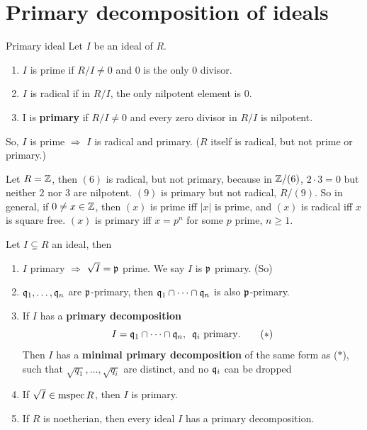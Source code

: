 \documentclass{article}
\begin{document}
\section{Primary decomposition of ideals}
\begin{fancydefine}{Primary ideal}
    Let $I$ be an ideal of $R$. \begin{enumerate}
        \item $I$ is prime if $R/I \neq 0$ and $0$ is the only $0$ divisor.
        \item $I$ is radical if in $R/I$, the only nilpotent element is $0$.
        \item I is \textbf{primary} if $R/I \neq 0$ and every zero divisor in $R/I$ is nilpotent.
    \end{enumerate}
    So, $I$ is prime $\Rightarrow$ $I$ is radical and primary.\gap
    ($R$ itself is radical, but not prime or primary.)
\end{fancydefine}
\begin{ex*}
    Let $R = \mathbb{Z}$, then $(6)$ is radical, but not primary, because in $\mathbb{Z}/(6)$, $2 \cdot 3 = 0$ but neither $2$ nor $3$ are nilpotent.\gap 
    $(9)$ is primary but not radical, $R/(9)$.
    So in general, if $0 \neq x \in \mathbb{Z}$, then $(x)$ is prime iff $|x|$ is prime, and $(x)$ is radical iff $x$ is square free. $(x)$ is primary iff $x=p^{n}$ for some $p$ prime, $n \geq 1$. 
\end{ex*}
\begin{fancyprop}{}
    Let $I \subsetneq R$ an ideal, then \begin{enumerate}
        \item $I$ primary $\Rightarrow$ $\sqrt{I} = \mathfrak{p}$ prime. We say $I$ is $\mathfrak{p}$ primary. (So)
        \item $\mathfrak{q}_{1}, \dots, \mathfrak{q}_{n}$ are $\mathfrak{p}$-primary, then $\mathfrak{q}_{1} \cap \dots \cap \mathfrak{q}_{n}$ is also $\mathfrak{p}$-primary.
        \item If $I$ has a \textbf{primary decomposition} \[I = \mathfrak{q}_{1} \cap \dots \cap \mathfrak{q}_{n}, \,\,\, \mathfrak{q}_{i} \text{ primary}. \tag{$*$}\]
        Then $I$ has a \textbf{minimal primary decomposition} of the same form as ($*$), such that $\sqrt{q_{1}}, \dots, \sqrt{q_{i}}$ are distinct, and no $\mathfrak{q}_{i}$ can be dropped
        \item If $\sqrt{I} \in \operatorname{mspec} R$, then $I$ is primary.
        \item If $R$ is noetherian, then every ideal $I$ has a primary decomposition.
    \end{enumerate}
\end{fancyprop}
\end{document}
